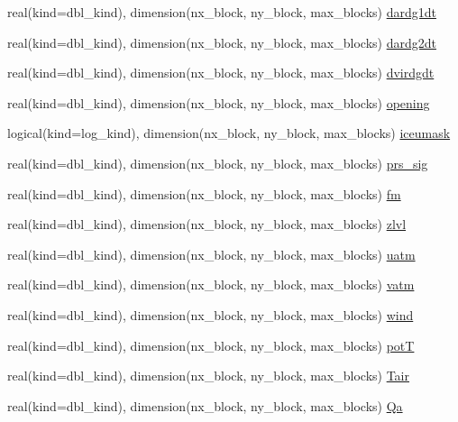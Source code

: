 \begin{DoxyCompactItemize}
real(kind=dbl\_\-kind), dimension(nx\_\-block, ny\_\-block, max\_\-blocks) \hyperlink{namespaceice__flux_ac0303bfce72171bb93ea1a621dc453eb}{dardg1dt}
\item 
real(kind=dbl\_\-kind), dimension(nx\_\-block, ny\_\-block, max\_\-blocks) \hyperlink{namespaceice__flux_a8d3dec0f51ebd0b3aaf71909b190656a}{dardg2dt}
\item 
real(kind=dbl\_\-kind), dimension(nx\_\-block, ny\_\-block, max\_\-blocks) \hyperlink{namespaceice__flux_ade5480c0fdf0d8989ec199ab6c494df2}{dvirdgdt}
\item 
real(kind=dbl\_\-kind), dimension(nx\_\-block, ny\_\-block, max\_\-blocks) \hyperlink{namespaceice__flux_ae0a39366aa114290bad9340508d55fd7}{opening}
\item 
logical(kind=log\_\-kind), dimension(nx\_\-block, ny\_\-block, max\_\-blocks) \hyperlink{namespaceice__flux_a2c8f3b751fc60ac7a93605e6bb887b0f}{iceumask}
\item 
real(kind=dbl\_\-kind), dimension(nx\_\-block, ny\_\-block, max\_\-blocks) \hyperlink{namespaceice__flux_a4406d054e8437ab55dc01d6e5b9c8882}{prs\_\-sig}
\item 
real(kind=dbl\_\-kind), dimension(nx\_\-block, ny\_\-block, max\_\-blocks) \hyperlink{namespaceice__flux_aa2cb3a98eac5adcd5441f55fe26be618}{fm}
\item 
real(kind=dbl\_\-kind), dimension(nx\_\-block, ny\_\-block, max\_\-blocks) \hyperlink{namespaceice__flux_a760e7ef6ee3c277e293ab9a2f92685cb}{zlvl}
\item 
real(kind=dbl\_\-kind), dimension(nx\_\-block, ny\_\-block, max\_\-blocks) \hyperlink{namespaceice__flux_accb62713c4d53aa9f56bccfa4faf6507}{uatm}
\item 
real(kind=dbl\_\-kind), dimension(nx\_\-block, ny\_\-block, max\_\-blocks) \hyperlink{namespaceice__flux_ace0435fd53553a1cae783a932576a39f}{vatm}
\item 
real(kind=dbl\_\-kind), dimension(nx\_\-block, ny\_\-block, max\_\-blocks) \hyperlink{namespaceice__flux_a1f1bd9712740289c1c1348265a70e838}{wind}
\item 
real(kind=dbl\_\-kind), dimension(nx\_\-block, ny\_\-block, max\_\-blocks) \hyperlink{namespaceice__flux_a81beec3343cd05b99ad439d5586d6156}{potT}
\item 
real(kind=dbl\_\-kind), dimension(nx\_\-block, ny\_\-block, max\_\-blocks) \hyperlink{namespaceice__flux_add98ec71fa0c35dbd9a7afcfa897081d}{Tair}
\item 
real(kind=dbl\_\-kind), dimension(nx\_\-block, ny\_\-block, max\_\-blocks) \hyperlink{namespaceice__flux_af6a4cdca38aa449d2c23bd0faaead20a}{Qa}

\end{DoxyCompactItemize}
